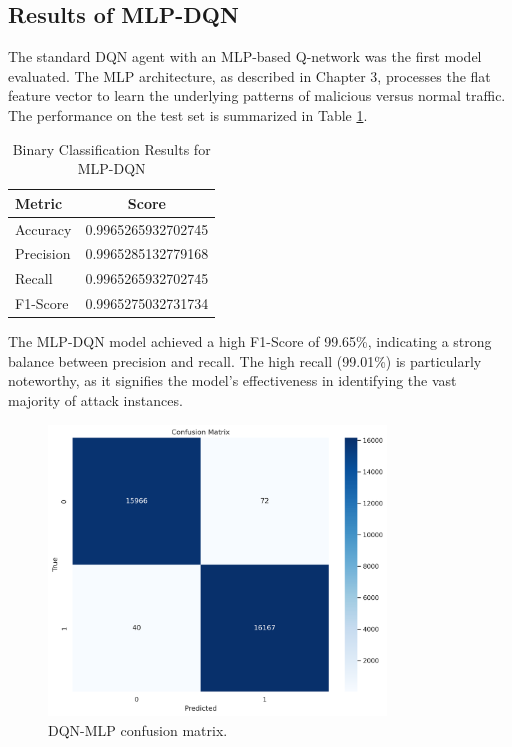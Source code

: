 \documentclass[12pt]{report}
\begin{document}
\subsection{Results of MLP-DQN}
The standard DQN agent with an MLP-based Q-network was the first model evaluated. The MLP architecture, as described in Chapter 3, processes the flat feature vector to learn the underlying patterns of malicious versus normal traffic. The performance on the test set is summarized in Table \ref{tab:binary_dqn_results}.

\begin{table}[H]
    \centering
    \caption{Binary Classification Results for MLP-DQN}
    \label{tab:binary_dqn_results}
    \begin{tabular}{@{}lc@{}}
        \toprule
        \textbf{Metric} & \textbf{Score} \\
        \midrule
        Accuracy & 0.9965265932702745 \\
        Precision & 0.9965285132779168 \\
        Recall & 0.9965265932702745 \\
        F1-Score & 0.9965275032731734 \\
        \bottomrule
    \end{tabular}
\end{table}

The MLP-DQN model achieved a high F1-Score of 99.65\%, indicating a strong balance between precision and recall. The high recall (99.01\%) is particularly noteworthy, as it signifies the model's effectiveness in identifying the vast majority of attack instances.
\begin{figure}[htbp]
    \centering
    \includegraphics[width=0.8\textwidth]{images/dqn_nn_confusion_matrix.png}
    \caption{DQN-MLP confusion matrix.}
    \label{fig:dqn_nn_confusion}
\end{figure}
\end{document}
